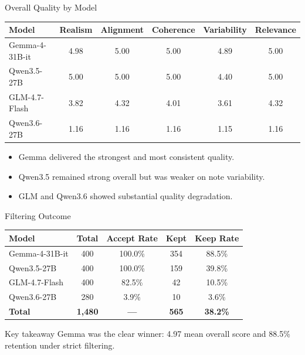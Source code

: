 \documentclass[aspectratio=169]{beamer}
\begin{document}
\begin{frame}{Overall Quality by Model}
    \scriptsize
    \begin{table}
        \centering
        \begin{tabular}{lccccc}
            \toprule
            \textbf{Model} & \textbf{Realism} & \textbf{Alignment} & \textbf{Coherence} & \textbf{Variability} & \textbf{Relevance} \\
            \midrule
            Gemma-4-31B-it & 4.98 & 5.00 & 5.00 & 4.89 & 5.00 \\
            Qwen3.5-27B & 5.00 & 5.00 & 5.00 & 4.40 & 5.00 \\
            GLM-4.7-Flash & 3.82 & 4.32 & 4.01 & 3.61 & 4.32 \\
            Qwen3.6-27B & 1.16 & 1.16 & 1.16 & 1.15 & 1.16 \\
            \bottomrule
        \end{tabular}
    \end{table}

    \begin{itemize}
        \item Gemma delivered the strongest and most consistent quality.
        \item Qwen3.5 remained strong overall but was weaker on note variability.
        \item GLM and Qwen3.6 showed substantial quality degradation.
    \end{itemize}
\end{frame}

\begin{frame}{Filtering Outcome}
    \small
    \begin{table}
        \centering
        \begin{tabular}{lcccc}
            \toprule
            \textbf{Model} & \textbf{Total} & \textbf{Accept Rate} & \textbf{Kept} & \textbf{Keep Rate} \\
            \midrule
            Gemma-4-31B-it & 400 & 100.0\% & 354 & 88.5\% \\
            Qwen3.5-27B & 400 & 100.0\% & 159 & 39.8\% \\
            GLM-4.7-Flash & 400 & 82.5\% & 42 & 10.5\% \\
            Qwen3.6-27B & 280 & 3.9\% & 10 & 3.6\% \\
            \midrule
            \textbf{Total} & \textbf{1,480} & \textbf{---} & \textbf{565} & \textbf{38.2\%} \\
            \bottomrule
        \end{tabular}
    \end{table}

    \begin{block}{Key takeaway}
        Gemma was the clear winner: 4.97 mean overall score and 88.5\% retention under strict filtering.
    \end{block}
\end{frame}
\end{document}
